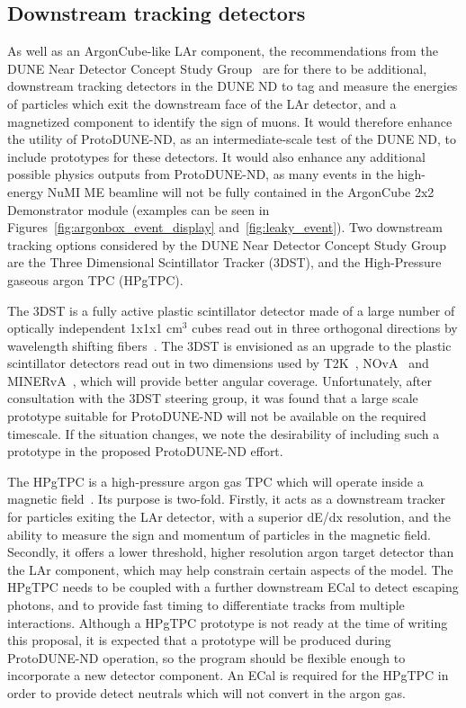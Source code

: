 \subsection{Downstream tracking detectors}
\label{sec:tracking_detectors}
As well as an ArgonCube-like LAr component, the recommendations from the DUNE Near Detector Concept Study Group~\cite{dune_ndcsg} are for there to be additional, downstream tracking detectors in the DUNE ND to tag and measure the energies of particles which exit the downstream face of the LAr detector, and a magnetized component to identify the sign of muons. It would therefore enhance the utility of ProtoDUNE-ND, as an intermediate-scale test of the DUNE ND, to include prototypes for these detectors. It would also enhance any additional possible physics outputs from ProtoDUNE-ND, as many events in the high-energy NuMI ME beamline will not be fully contained in the ArgonCube 2x2 Demonstrator module (examples can be seen in Figures~\ref{fig:argonbox_event_display} and~\ref{fig:leaky_event}). Two downstream tracking options considered  by the DUNE Near Detector Concept Study Group are the Three Dimensional Scintillator Tracker (3DST), and the High-Pressure gaseous argon TPC (HPgTPC).

The 3DST is a fully active plastic scintillator detector made of a large number of optically independent 1x1x1 cm$^{3}$ cubes read out in three orthogonal directions by wavelength shifting fibers~\cite{3dst}. The 3DST is envisioned as an upgrade to the plastic scintillator detectors read out in two dimensions used by T2K~\cite{t2k-fgd,t2k-ingrid}, NOvA~\cite{nova} and MINERvA~\cite{minerva-nim}, which will provide better angular coverage. Unfortunately, after consultation with the 3DST steering group, it was found that a large scale prototype suitable for ProtoDUNE-ND will not be available on the required timescale. If the situation changes, we note the desirability of including such a prototype in the proposed ProtoDUNE-ND effort.

The HPgTPC is a high-pressure argon gas TPC which will operate inside a magnetic field~\cite{dune_ndcsg}. Its purpose is two-fold. Firstly, it acts as a downstream tracker for particles exiting the LAr detector, with a superior dE/dx resolution, and the ability to measure the sign and momentum of particles in the magnetic field. Secondly, it offers a lower threshold, higher resolution argon target detector than the LAr component, which may help constrain certain aspects of the model. The HPgTPC needs to be coupled with a further downstream ECal to detect escaping photons, and to provide fast timing to differentiate tracks from multiple interactions. Although a HPgTPC prototype is not ready at the time of writing this proposal, it is expected that a prototype will be produced during ProtoDUNE-ND operation, so the program should be flexible enough to incorporate a new detector component. An ECal is required for the HPgTPC in order to provide detect neutrals which will not convert in the argon gas.

